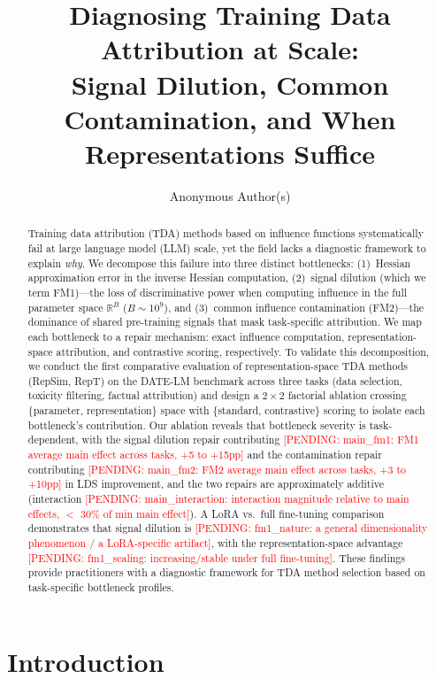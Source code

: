 \documentclass{article}
\title{Diagnosing Training Data Attribution at Scale:\\Signal Dilution, Common Contamination, and When Representations Suffice}
\author{
  Anonymous Author(s)
}
\newcommand{\pending}[1]{\textcolor{red}{[PENDING: #1]}}
\begin{document}
\maketitle

\begin{abstract}
Training data attribution (TDA) methods based on influence functions systematically fail at large language model (LLM) scale, yet the field lacks a diagnostic framework to explain \emph{why}. We decompose this failure into three distinct bottlenecks: (1)~Hessian approximation error in the inverse Hessian computation, (2)~signal dilution (which we term FM1)---the loss of discriminative power when computing influence in the full parameter space $\mathbb{R}^B$ ($B \sim 10^9$), and (3)~common influence contamination (FM2)---the dominance of shared pre-training signals that mask task-specific attribution. We map each bottleneck to a repair mechanism: exact influence computation, representation-space attribution, and contrastive scoring, respectively. To validate this decomposition, we conduct the first comparative evaluation of representation-space TDA methods (RepSim, RepT) on the DATE-LM benchmark across three tasks (data selection, toxicity filtering, factual attribution) and design a $2 \times 2$ factorial ablation crossing \{parameter, representation\} space with \{standard, contrastive\} scoring to isolate each bottleneck's contribution. Our ablation reveals that bottleneck severity is task-dependent, with the signal dilution repair contributing \pending{main\_fm1: FM1 average main effect across tasks, +5 to +15pp} and the contamination repair contributing \pending{main\_fm2: FM2 average main effect across tasks, +3 to +10pp} in LDS improvement, and the two repairs are approximately additive (interaction \pending{main\_interaction: interaction magnitude relative to main effects, $<$ 30\% of min main effect}). A LoRA vs.\ full fine-tuning comparison demonstrates that signal dilution is \pending{fm1\_nature: a general dimensionality phenomenon / a LoRA-specific artifact}, with the representation-space advantage \pending{fm1\_scaling: increasing/stable under full fine-tuning}. These findings provide practitioners with a diagnostic framework for TDA method selection based on task-specific bottleneck profiles.
\end{abstract}

\section{Introduction}
\label{sec:introduction}
\end{document}
